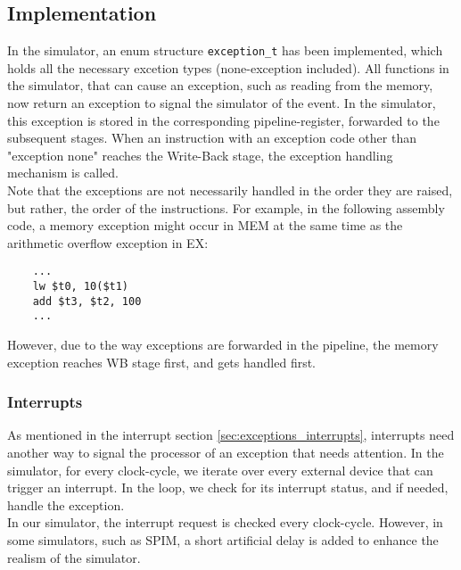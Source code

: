 \subsection{Implementation}
In the simulator, an enum structure \texttt{exception\_t} has been implemented, which
holds all the necessary excetion types (none-exception included).
All functions in the simulator, that can cause an exception, such as reading
from the memory, now return an exception to signal the simulator of the event.
In the simulator, this exception is stored in the corresponding pipeline-register,
forwarded to the subsequent stages. When an instruction with an exception code other
than "exception none" reaches the Write-Back stage, the exception handling
mechanism is called.\\
Note that the exceptions are not necessarily handled in the order they are
raised, but rather, the order of the instructions. For example, in the following
assembly code, a memory exception might occur in MEM at the same time as the arithmetic
overflow exception in EX:
\begin{lstlisting}
	...
	lw $t0, 10($t1)
	add $t3, $t2, 100
	...
\end{lstlisting}
However, due to the way exceptions are forwarded in the pipeline, the memory
exception reaches WB stage first, and gets handled first.

\subsubsection{Interrupts}
As mentioned in the interrupt section \ref{sec:exceptions_interrupts}, interrupts
need another way to signal the processor of an exception that needs attention.
In the simulator, for every clock-cycle, we iterate over every external device
that can trigger an interrupt.
In the loop, we check for its interrupt status, and if needed, handle the exception.\\
In our simulator, the interrupt request is checked every clock-cycle. However,
in some simulators, such as SPIM, a short artificial delay is added to enhance
the realism of the simulator\cite{cod5:appendix}.


